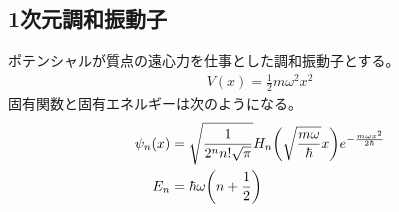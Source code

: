 \documentclass[uplatex,dvipdfmx,a4paper,11pt]{jlreq}
\numberwithin{equation}{section}
\theoremstyle{definition}
\begin{document}
\subsection{1次元調和振動子}
\begin{proposition}
  ポテンシャルが質点の遠心力を仕事とした調和振動子とする。
  \begin{align}
    V(x) = \frac{1}{2}m\omega^2x^2
  \end{align}
  固有関数と固有エネルギーは次のようになる。
  \begin{align}
    \psi_n(x) & = \sqrt{\frac{1}{2^nn!\sqrt{\pi}}}H_n\qty(\sqrt{\frac{m\omega}{\hbar}}x)e^{-\frac{m\omega x^2}{2\hbar}} \\
    E_n       & = \hbar\omega\qty(n + \frac{1}{2})
  \end{align}
\end{proposition}
\end{document}
